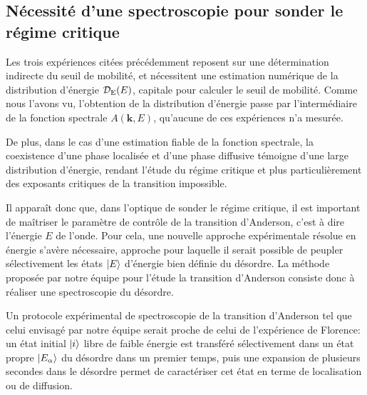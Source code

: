 \subsection{Nécessité d'une spectroscopie pour sonder le régime critique}
\label{sc:spectroscopie_transition}
Les trois expériences citées précédemment reposent sur une détermination indirecte du seuil de mobilité, et nécessitent une estimation numérique de la distribution d'énergie $\mathcal{D}_{\mathrm{E}}(E)$, capitale pour calculer le seuil de mobilité. Comme nous l'avons vu, l'obtention de la distribution d'énergie passe par l'intermédiaire de la fonction spectrale $A(\mathbf{k},E)$, qu'aucune de ces expériences n'a mesurée. 

De plus, dans le cas d'une estimation fiable de la fonction spectrale, la coexistence d'une phase localisée et d'une phase diffusive témoigne d'une large distribution d'énergie, rendant l'étude du régime critique et plus particulièrement des exposants critiques de la transition impossible.

Il apparaît donc que, dans l'optique de sonder le régime critique, il est important de maîtriser le paramètre de contrôle de la transition d'Anderson, c'est à dire l'énergie $E$ de l'onde. Pour cela, une nouvelle approche expérimentale résolue en énergie s'avère nécessaire, approche pour laquelle il serait possible de peupler sélectivement les états $\left| E \right\rangle$ d'énergie bien définie du désordre. La méthode proposée par notre équipe pour l'étude la transition d'Anderson consiste donc à réaliser une spectroscopie du désordre.





Un protocole expérimental de spectroscopie de la transition d'Anderson tel que celui envisagé par notre équipe serait proche de celui de l'expérience de Florence: un état initial $\left| i \right\rangle$ libre de faible énergie est transféré sélectivement dans un état propre $\left| E_\alpha \right\rangle$ du désordre dans un premier temps, puis une expansion de plusieurs secondes dans le désordre permet de caractériser cet état en terme de localisation ou de diffusion. 




